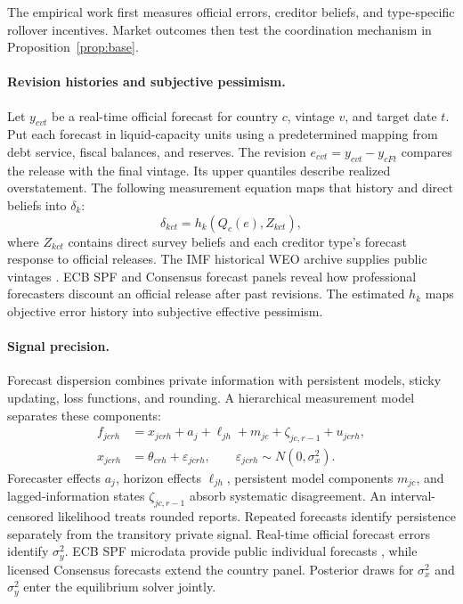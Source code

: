 \documentclass[11pt]{article}
\theoremstyle{definition}
\begin{document}
The empirical work first measures official errors, creditor beliefs, and type-specific rollover incentives. Market outcomes then test the coordination mechanism in Proposition~\ref{prop:base}.

\paragraph{Revision histories and subjective pessimism.} Let $y_{cvt}$ be a real-time official forecast for country $c$, vintage $v$, and target date $t$. Put each forecast in liquid-capacity units using a predetermined mapping from debt service, fiscal balances, and reserves. The revision $e_{cvt}=y_{cvt}-y_{cFt}$ compares the release with the final vintage. Its upper quantiles describe realized overstatement. The following measurement equation maps that history and direct beliefs into $\delta_k$:
\begin{equation}
\delta_{kct}=h_k\!\left(Q_c(e),Z_{kct}\right),
\label{eq:delta-measurement}
\end{equation}
where $Z_{kct}$ contains direct survey beliefs and each creditor type's forecast response to official releases. The IMF historical WEO archive supplies public vintages \citep{IMFWEOData}. ECB SPF and Consensus forecast panels reveal how professional forecasters discount an official release after past revisions. The estimated $h_k$ maps objective error history into subjective effective pessimism.

\paragraph{Signal precision.} Forecast dispersion combines private information with persistent models, sticky updating, loss functions, and rounding. A hierarchical measurement model separates these components:
\begin{align}
f_{jcrh}&=x_{jcrh}+a_j+\ell_{jh}+m_{jc}+\zeta_{jc,r-1}+u_{jcrh}, \nonumber\\
x_{jcrh}&=\theta_{crh}+\varepsilon_{jcrh},
\qquad \varepsilon_{jcrh}\sim N(0,\sigma_x^2).
\label{eq:forecast-measurement}
\end{align}
Forecaster effects $a_j$, horizon effects $\ell_{jh}$, persistent model components $m_{jc}$, and lagged-information states $\zeta_{jc,r-1}$ absorb systematic disagreement. An interval-censored likelihood treats rounded reports. Repeated forecasts identify persistence separately from the transitory private signal. Real-time official forecast errors identify $\sigma_y^2$. ECB SPF microdata provide public individual forecasts \citep{ECBSPFData}, while licensed Consensus forecasts extend the country panel. Posterior draws for $\sigma_x^2$ and $\sigma_y^2$ enter the equilibrium solver jointly.
\end{document}
